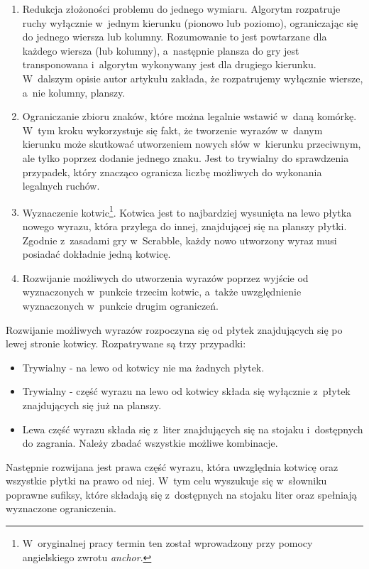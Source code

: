 \documentclass[a4paper,twocolumn,12pt]{article}
\theoremstyle{definition}
\begin{document}
\begin{enumerate}
 \item Redukcja złożoności problemu do jednego wymiaru. Algorytm rozpatruje ruchy wyłącznie w~jednym kierunku (pionowo lub poziomo), ograniczając się do jednego wiersza lub kolumny. Rozumowanie to jest powtarzane dla każdego wiersza (lub kolumny), a~następnie plansza do gry jest transponowana i~algorytm wykonywany jest dla drugiego kierunku. W~dalszym opisie autor artykułu zakłada, że rozpatrujemy wyłącznie wiersze, a~nie kolumny, planszy.
 \item Ograniczanie zbioru znaków, które można legalnie wstawić w~daną komórkę. W~tym kroku wykorzystuje się fakt, że tworzenie wyrazów w~danym kierunku może skutkować utworzeniem nowych słów w~kierunku przeciwnym, ale tylko poprzez dodanie jednego znaku. Jest to trywialny do sprawdzenia przypadek, który znacząco ogranicza liczbę możliwych do wykonania legalnych ruchów.
 \item Wyznaczenie kotwic\footnote{W~oryginalnej pracy termin ten został wprowadzony przy pomocy angielskiego zwrotu \emph{anchor}.}. Kotwica jest to najbardziej wysunięta na lewo płytka nowego wyrazu, która przylega do innej, znajdującej się na planszy płytki. Zgodnie z~zasadami gry w~Scrabble, każdy nowo utworzony wyraz musi posiadać dokładnie jedną kotwicę.
 \item Rozwijanie możliwych do utworzenia wyrazów poprzez wyjście od wyznaczonych w~punkcie trzecim kotwic, a~także uwzględnienie wyznaczonych w~punkcie drugim ograniczeń. 
\end{enumerate}

Rozwijanie możliwych wyrazów rozpoczyna się od płytek znajdujących się po lewej stronie kotwicy. Rozpatrywane są trzy przypadki:

\begin{itemize}
 \item Trywialny - na lewo od kotwicy nie ma żadnych płytek.
 \item Trywialny - część wyrazu na lewo od kotwicy składa się wyłącznie z~płytek znajdujących się już na planszy.
 \item Lewa część wyrazu składa się z~liter znajdujących się na stojaku i~dostępnych do zagrania. Należy zbadać wszystkie możliwe kombinacje.
\end{itemize}

Następnie rozwijana jest prawa część wyrazu, która uwzględnia kotwicę oraz wszystkie płytki na prawo od niej. W~tym celu wyszukuje się w~słowniku poprawne sufiksy, które składają się z~dostępnych na stojaku liter oraz spełniają wyznaczone ograniczenia.
\end{document}
